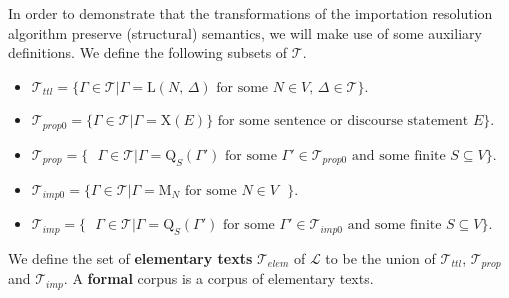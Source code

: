 \documentclass{IOS-Book-Article}
\newcommand{\texts}{ \mathcal{T} }
\newcommand{\lan}{ \mathcal{L} }
\newcommand{\ttl}{\mathit{ttl}}
\newcommand{\propz}{\mathit{prop0}}
\newcommand{\prop}{\mathit{prop}}
\newcommand{\impz}{\mathit{imp0}}
\newcommand{\imp}{\mathit{imp}}
\newcommand{\elem}{\mathit{elem}}
\newcommand{\domOp}[1]{\mathrm{Q}_{#1}}
\newcommand{\txtOp}{\mathrm{X}}
\newcommand{\txtOpone}[1]{\txtOp(#1)}
\newcommand{\ttlOp}[2]{\mathrm{L}(\text{$#1$, $#2$})}
\newcommand{\impOp}[1]{\mathrm{M}_{#1}}
\begin{document}
\noindent In order to demonstrate that the transformations of the importation resolution algorithm preserve (structural) semantics, we will make use of some auxiliary definitions.
We define the following subsets of $\texts$.
\begin{itemize}
\item $\texts_\ttl = \{
\text{$\Gamma\in\texts|\Gamma=\ttlOp{N}{\Delta}$ for some $N\in V$, $\Delta\in\texts$}
\}$.
\item $\texts_\propz = \{
\text{$\Gamma\in\texts|\Gamma=\txtOpone{E}\}$ for some sentence or discourse statement $E$}
\}$.
\item $\texts_\prop = \{
\text{ $\Gamma\in\texts|\Gamma=\domOp{S}(\Gamma')$ for some $\Gamma'\in\texts_\propz$ and some finite $S\subseteq V$}
\}$.
\item $\texts_\impz = \{ 
\text{$\Gamma\in\texts|\Gamma=\impOp{N}$ for some $N\in V$ } 
\}$.
\item $\texts_\imp = \{
\text{ $\Gamma\in\texts|\Gamma=\domOp{S}(\Gamma')$ for some $\Gamma'\in\texts_\impz$ and some finite $S\subseteq V$}
\}$.
\end{itemize}
We define the set of \textbf{elementary texts} $\texts_\elem$ of $\lan$ to be the union of $\texts_\ttl$, $\texts_\prop$ and $\texts_\imp$.
A \textbf{formal} corpus is a corpus of elementary texts.
\end{document}

